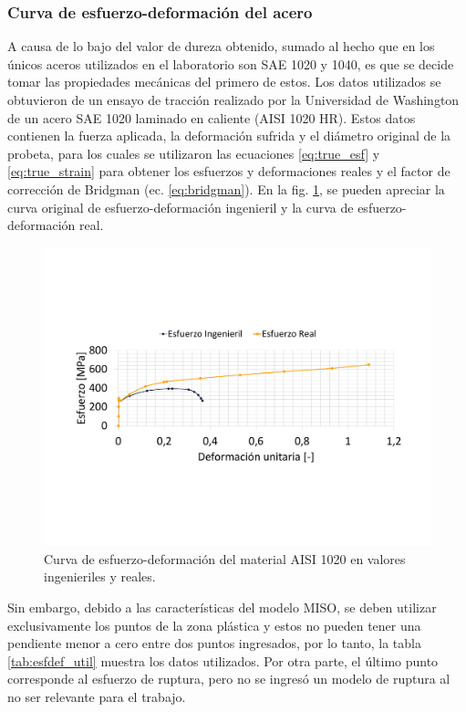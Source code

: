 \subsubsection{Curva de esfuerzo-deformación del acero}
A causa de lo bajo del valor de dureza obtenido, sumado al hecho que en los únicos aceros utilizados en el laboratorio son SAE 1020 y 1040, es que se decide tomar las propiedades mecánicas del primero de estos. Los datos utilizados se obtuvieron de un ensayo de tracción realizado por la Universidad de Washington de un acero SAE 1020 laminado en caliente (AISI 1020 HR)\cite{1020data}. Estos datos contienen la fuerza aplicada, la deformación sufrida y el diámetro original de la probeta, para los cuales se utilizaron las ecuaciones \ref{eq:true_esf} y \ref{eq:true_strain} para obtener los esfuerzos y deformaciones reales y el factor de corrección de Bridgman (ec. \ref{eq:bridgman}). En la fig. \ref{fig:esf_realing}, se pueden apreciar la curva original de esfuerzo-deformación ingenieril y la curva de esfuerzo-deformación real. 

\begin{figure}[h]
\centering
\includegraphics[width=1\linewidth, trim={2cm 6cm 2cm 5cm},clip]{Imagenes/esf_real_ing.pdf}
\caption{Curva de esfuerzo-deformación del material AISI 1020 en valores ingenieriles y reales.}
\label{fig:esf_realing}
\end{figure}

Sin embargo, debido a las características del modelo MISO, se deben utilizar exclusivamente los puntos de la zona plástica y estos no pueden tener una pendiente menor a cero entre dos puntos ingresados, por lo tanto, la tabla \ref{tab:esfdef_util} muestra los datos utilizados. Por otra parte, el último punto corresponde al esfuerzo de ruptura, pero no se ingresó un modelo de ruptura al no ser relevante para el trabajo. 

